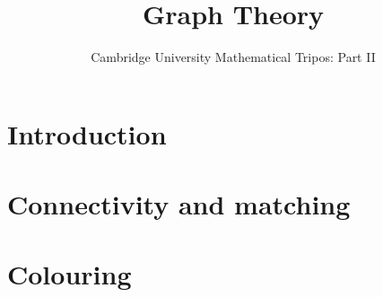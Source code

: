 \documentclass{article}
\title{Graph Theory}
\author{Cambridge University Mathematical Tripos: Part II}
\begin{document}
\maketitle

\tableofcontentsnewpage{}

\section{Introduction}

\section{Connectivity and matching}

\section{Colouring}

\end{document}
